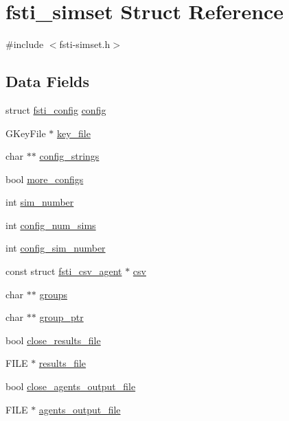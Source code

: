 \hypertarget{structfsti__simset}{}\section{fsti\+\_\+simset Struct Reference}
\label{structfsti__simset}


{\ttfamily \#include $<$fsti-\/simset.\+h$>$}

\subsection*{Data Fields}
\begin{DoxyCompactItemize}
\item 
struct \mbox{\hyperlink{structfsti__config}{fsti\+\_\+config}} \mbox{\hyperlink{structfsti__simset_add8d85ac062f5eff4ad3342c4a9cae75}{config}}
\item 
G\+Key\+File $\ast$ \mbox{\hyperlink{structfsti__simset_a8375a8f4e415c4a93ad7c00c9bea3f11}{key\+\_\+file}}
\item 
char $\ast$$\ast$ \mbox{\hyperlink{structfsti__simset_a7610ad16eda85f1951f06e9543701f41}{config\+\_\+strings}}
\item 
bool \mbox{\hyperlink{structfsti__simset_a19c6162acc10b9986c30363287088295}{more\+\_\+configs}}
\item 
int \mbox{\hyperlink{structfsti__simset_ac00dba7fb65ecba47a36ef06074dd36a}{sim\+\_\+number}}
\item 
int \mbox{\hyperlink{structfsti__simset_afc51713c1ac07b9a3ba0cecaf780b909}{config\+\_\+num\+\_\+sims}}
\item 
int \mbox{\hyperlink{structfsti__simset_a0798e1d03a30f50a05a1f70c2fd5c3bb}{config\+\_\+sim\+\_\+number}}
\item 
const struct \mbox{\hyperlink{structfsti__csv__agent}{fsti\+\_\+csv\+\_\+agent}} $\ast$ \mbox{\hyperlink{structfsti__simset_aeb197e0d40c9abe228e68794bb16c788}{csv}}
\item 
char $\ast$$\ast$ \mbox{\hyperlink{structfsti__simset_a9cfabd7df79f967edc1fbc4cb0167340}{groups}}
\item 
char $\ast$$\ast$ \mbox{\hyperlink{structfsti__simset_a69ebc16676d0f561b04917b32962a584}{group\+\_\+ptr}}
\item 
bool \mbox{\hyperlink{structfsti__simset_ac856c2720d04c80897f91027807911c7}{close\+\_\+results\+\_\+file}}
\item 
F\+I\+LE $\ast$ \mbox{\hyperlink{structfsti__simset_aa8df01cdf345dbdc9a3ef68e655e4c6e}{results\+\_\+file}}
\item 
bool \mbox{\hyperlink{structfsti__simset_a01f5a50549ef5c8e1777239925f258a2}{close\+\_\+agents\+\_\+output\+\_\+file}}
\item 
F\+I\+LE $\ast$ \mbox{\hyperlink{structfsti__simset_ad70eea043ec6c16dcbd225923e66ead4}{agents\+\_\+output\+\_\+file}}
\end{DoxyCompactItemize}


